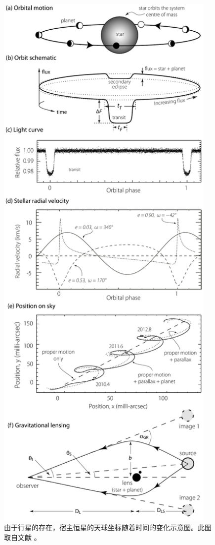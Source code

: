 \begin{figure}[h!]
\centering
\includegraphics[width=0.95\textwidth]{figures/chapter1/fig7_astrometry.pdf}
\caption[由于行星的存在，宿主恒星的天球坐标随着时间的变化示意图，版权所有：Perryman M。]{由于行星的存在，宿主恒星的天球坐标随着时间的变化示意图。此图取自文献 。}
\label{fig:astrometry}
\end{figure}


